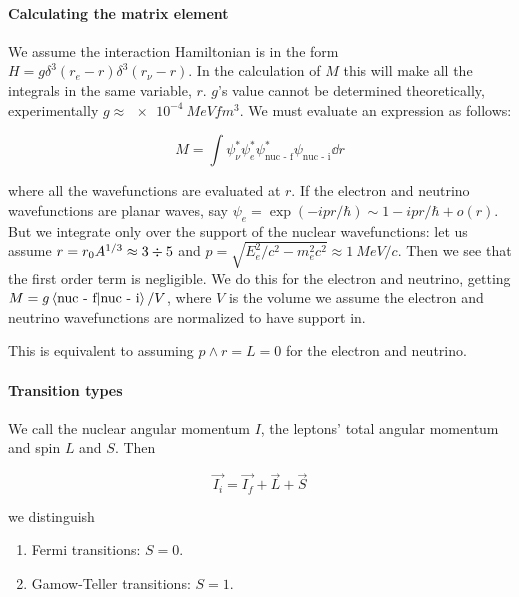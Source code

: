 \documentclass[main.tex]{subfiles}
\begin{document}
\paragraph{Calculating the matrix element}

We assume the interaction Hamiltonian is in the form \(H = g \delta^3(r_e-r) \delta^3(r_\nu - r)\). In the calculation of \(M\) this will make all the integrals in the same variable, \(r\).
\(g\)'s value cannot be determined theoretically, experimentally \(g \approx \SI{e-4}{MeV fm^{3}} \).
We must evaluate an expression as follows:

\begin{equation}
    M = \int  \psi_\nu^* \psi_e^* \psi_{\text{nuc - f}}^* \psi_{\text{nuc - i}}  \dd{r}
\end{equation}

where all the wavefunctions are evaluated at \(r\). If the electron and neutrino wavefunctions are planar waves, say \(\psi_e = \exp(-ipr/\hbar) \sim 1 - ipr/\hbar + o(r)\). But we integrate only over the support of the nuclear wavefunctions: let us assume \(r = r_0 A^{1/3} \approx 3 \divisionsymbol 5\) and \(p = \sqrt{E_e^2/c^2 - m_e^2 c^2} \approx \SI{1}{MeV/c}  \). Then we see that the first order term is negligible. We do this for the electron and neutrino, getting
\(M = g \braket{\text{nuc - f}}{\text{nuc - i}}/V \), where \(V\) is the volume we assume the electron and neutrino wavefunctions are normalized to have support in.

This is equivalent to assuming \(p \wedge r = L = 0\) for the electron and neutrino.

\paragraph{Transition types}

We call the nuclear angular momentum \(I\), the leptons' total angular momentum and spin \(L\) and \(S\). Then

\begin{equation}
    \vec{I_i} = \vec{I_f} + \vec{L} + \vec{S}
\end{equation}

we distinguish

\begin{enumerate}
     \item Fermi transitions: \(S = 0\).
    \item Gamow-Teller transitions: \(S = 1\).
\end{enumerate}
\end{document}
